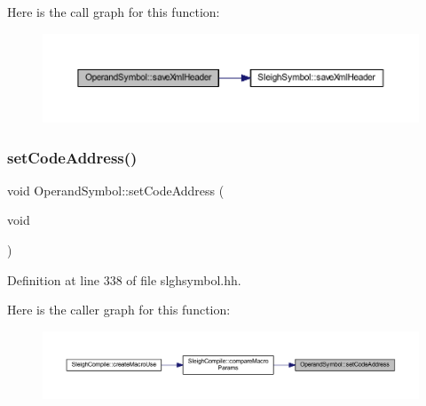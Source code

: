 Here is the call graph for this function\+:
\nopagebreak
\begin{figure}[H]
\begin{center}
\leavevmode
\includegraphics[width=350pt]{class_operand_symbol_a9cdbc0cf454ad7ed2b3683100a4a8de0_cgraph}
\end{center}
\end{figure}
\mbox{\label{class_operand_symbol_af7a8f9c15ef41de7385def495e073c0b}} 
\subsubsection{\texorpdfstring{setCodeAddress()}{setCodeAddress()}}
{\footnotesize\ttfamily void Operand\+Symbol\+::set\+Code\+Address (\begin{DoxyParamCaption}\item[{void}]{ }\end{DoxyParamCaption})\hspace{0.3cm}{\ttfamily [inline]}}



Definition at line 338 of file slghsymbol.\+hh.

Here is the caller graph for this function\+:
\nopagebreak
\begin{figure}[H]
\begin{center}
\leavevmode
\includegraphics[width=350pt]{class_operand_symbol_af7a8f9c15ef41de7385def495e073c0b_icgraph}
\end{center}
\end{figure}
\mbox{\label{class_operand_symbol_a0b306a07c71c5d101a160c776cccb961}} 
